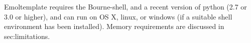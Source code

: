 \documentclass[11pt]{article}
\begin{document}

Emoltemplate requires the Bourne-shell, and a recent version of python (2.7 or 3.0 or higher), and can run on OS X, linux, or windows (if a suitable shell environment has been installed).  Memory requirements are discussed in {sec:limitations}.



%
%
\end{document}
